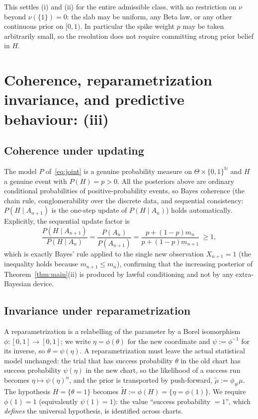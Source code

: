 \documentclass{amsart}
\theoremstyle{definition}
\newcommand{\N}{\mathbb{N}}
\begin{document}
This settles (i) and (ii) for the entire admissible class, with no restriction
on $\nu$ beyond $\nu(\{1\})=0$: the slab may be uniform, any Beta law, or any
other continuous prior on $[0,1)$. In particular the spike weight $p$ may be
taken arbitrarily small, so the resolution does not require committing strong
prior belief in $H$.

\section{Coherence, reparametrization invariance, and predictive behaviour: (iii)}
\label{sec:coherence}

\subsection{Coherence under updating}
The model $P$ of~\eqref{eq:joint} is a genuine probability measure on
$\Theta\times\{0,1\}^\N$ and $H$ a genuine event with $P(H)=p>0$. All the
posteriors above are ordinary conditional probabilities of positive-probability
events, so Bayes coherence (the chain rule, conglomerability over the discrete
data, and sequential consistency: $P(H\mid A_{n+1})$ is the one-step update of
$P(H\mid A_n)$) holds automatically. Explicitly, the sequential update factor is
\begin{equation}\label{eq:sequential}
  \frac{P(H\mid A_{n+1})}{P(H\mid A_n)}
  =\frac{P(A_n)}{P(A_{n+1})}
  =\frac{p+(1-p)m_n}{p+(1-p)m_{n+1}}\ \ge 1,
\end{equation}
which is exactly Bayes' rule applied to the single new observation
$X_{n+1}=1$ (the inequality holds because $m_{n+1}\le m_n$), confirming that the
increasing posterior of Theorem~\ref{thm:main}(ii) is produced by lawful
conditioning and not by any extra-Bayesian device.

\subsection{Invariance under reparametrization}
A reparametrization is a relabelling of the parameter by a Borel isomorphism
$\phi:[0,1]\to[0,1]$; we write $\eta=\phi(\theta)$ for the new coordinate and
$\psi:=\phi^{-1}$ for its inverse, so $\theta=\psi(\eta)$. A reparametrization
must leave the actual statistical model unchanged: the trial that has success
probability $\theta$ in the old chart has success probability $\psi(\eta)$ in
the new chart, so the likelihood of a success run becomes
$\eta\mapsto\psi(\eta)^n$, and the prior is transported by push-forward,
$\tilde\mu:=\phi_\#\mu$. The hypothesis $H=\{\theta=1\}$ becomes
$\tilde H:=\phi(H)=\{\eta=\phi(1)\}$. We require $\phi(1)=1$ (equivalently
$\psi(1)=1$): the value ``success probability $=1$'', which \emph{defines} the
universal hypothesis, is identified across charts.
\end{document}
